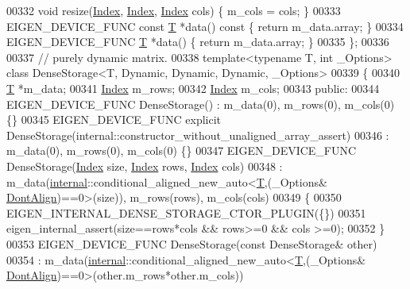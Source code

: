 \begin{DoxyCode}
00332     \textcolor{keywordtype}{void} resize(\hyperlink{namespace_eigen_a62e77e0933482dafde8fe197d9a2cfde}{Index}, \hyperlink{namespace_eigen_a62e77e0933482dafde8fe197d9a2cfde}{Index}, \hyperlink{namespace_eigen_a62e77e0933482dafde8fe197d9a2cfde}{Index} cols) \{ m\_cols = cols; \}
00333     EIGEN\_DEVICE\_FUNC \textcolor{keyword}{const} \hyperlink{group___sparse_core___module_class_eigen_1_1_triplet}{T} *data()\textcolor{keyword}{ const }\{ \textcolor{keywordflow}{return} m\_data.array; \}
00334     EIGEN\_DEVICE\_FUNC \hyperlink{group___sparse_core___module_class_eigen_1_1_triplet}{T} *data() \{ \textcolor{keywordflow}{return} m\_data.array; \}
00335 \};
00336 
00337 \textcolor{comment}{// purely dynamic matrix.}
00338 \textcolor{keyword}{template}<\textcolor{keyword}{typename} T, \textcolor{keywordtype}{int} \_Options> \textcolor{keyword}{class }DenseStorage<T, Dynamic, Dynamic, Dynamic, \_Options>
00339 \{
00340     \hyperlink{group___sparse_core___module_class_eigen_1_1_triplet}{T} *m\_data;
00341     \hyperlink{namespace_eigen_a62e77e0933482dafde8fe197d9a2cfde}{Index} m\_rows;
00342     \hyperlink{namespace_eigen_a62e77e0933482dafde8fe197d9a2cfde}{Index} m\_cols;
00343   \textcolor{keyword}{public}:
00344     EIGEN\_DEVICE\_FUNC DenseStorage() : m\_data(0), m\_rows(0), m\_cols(0) \{\}
00345     EIGEN\_DEVICE\_FUNC \textcolor{keyword}{explicit} DenseStorage(internal::constructor\_without\_unaligned\_array\_assert)
00346        : m\_data(0), m\_rows(0), m\_cols(0) \{\}
00347     EIGEN\_DEVICE\_FUNC DenseStorage(\hyperlink{namespace_eigen_a62e77e0933482dafde8fe197d9a2cfde}{Index} size, \hyperlink{namespace_eigen_a62e77e0933482dafde8fe197d9a2cfde}{Index} rows, \hyperlink{namespace_eigen_a62e77e0933482dafde8fe197d9a2cfde}{Index} cols)
00348       : m\_data(\hyperlink{namespaceinternal}{internal}::conditional\_aligned\_new\_auto<\hyperlink{group___sparse_core___module_class_eigen_1_1_triplet}{T},(\_Options&
      \hyperlink{group__enums_ggaacded1a18ae58b0f554751f6cdf9eb13a40a452614141522dd313363dbbd65726}{DontAlign})==0>(size)), m\_rows(rows), m\_cols(cols)
00349     \{
00350       EIGEN\_INTERNAL\_DENSE\_STORAGE\_CTOR\_PLUGIN(\{\})
00351       eigen\_internal\_assert(size==rows*cols && rows>=0 && cols >=0);
00352     \}
00353     EIGEN\_DEVICE\_FUNC DenseStorage(\textcolor{keyword}{const} DenseStorage& other)
00354       : m\_data(\hyperlink{namespaceinternal}{internal}::conditional\_aligned\_new\_auto<\hyperlink{group___sparse_core___module_class_eigen_1_1_triplet}{T},(\_Options&
      \hyperlink{group__enums_ggaacded1a18ae58b0f554751f6cdf9eb13a40a452614141522dd313363dbbd65726}{DontAlign})==0>(other.m\_rows*other.m\_cols))

\end{DoxyCode}
